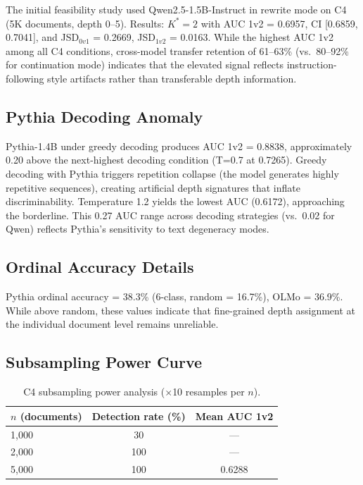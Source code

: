 \documentclass[11pt]{article}
\newcommand{\kstar}{K^*}
\begin{document}
The initial feasibility study used Qwen2.5-1.5B-Instruct in rewrite mode on C4 (5K documents, depth 0--5). Results: $\kstar{=}2$ with AUC 1v2 = 0.6957, CI [0.6859, 0.7041], and JSD$_{0v1}$ = 0.2669, JSD$_{1v2}$ = 0.0163. While the highest AUC 1v2 among all C4 conditions, cross-model transfer retention of 61--63\% (vs.\ 80--92\% for continuation mode) indicates that the elevated signal reflects instruction-following style artifacts rather than transferable depth information.


\subsection{Pythia Decoding Anomaly}
\label{app:pythia_decoding}

Pythia-1.4B under greedy decoding produces AUC 1v2 = 0.8838, approximately 0.20 above the next-highest decoding condition (T=0.7 at 0.7265). Greedy decoding with Pythia triggers repetition collapse (the model generates highly repetitive sequences), creating artificial depth signatures that inflate discriminability. Temperature 1.2 yields the lowest AUC (0.6172), approaching the borderline. This 0.27 AUC range across decoding strategies (vs.\ 0.02 for Qwen) reflects Pythia's sensitivity to text degeneracy modes.


\subsection{Ordinal Accuracy Details}
\label{app:ordinal}

Pythia ordinal accuracy = 38.3\% (6-class, random = 16.7\%), OLMo = 36.9\%. While above random, these values indicate that fine-grained depth assignment at the individual document level remains unreliable.


\subsection{Subsampling Power Curve}
\label{app:power}

\begin{table}[h]
\centering
\caption{C4 subsampling power analysis ($\times$10 resamples per $n$).}
\label{tab:power}
\small
\begin{tabular}{lcc}
\toprule
$n$ (documents) & Detection rate (\%) & Mean AUC 1v2 \\
\midrule
1,000 & 30 & --- \\
2,000 & 100 & --- \\
5,000 & 100 & 0.6288 \\
\bottomrule
\end{tabular}
\end{table}
\end{document}
